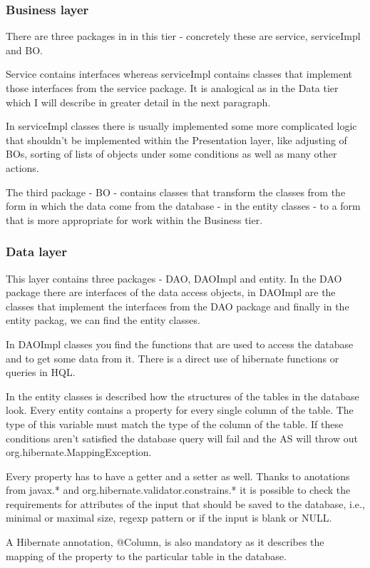\documentclass[thesis=B,english]{FITthesis}[2012/10/20]
\begin{document}
\subsubsection{Business layer}
There are three packages in in this tier - concretely these are service, serviceImpl and BO. 

Service contains interfaces whereas serviceImpl contains classes that implement those interfaces from the service package. It is analogical as in the Data tier which I will describe in greater detail in the next paragraph.

In serviceImpl classes there is usually implemented some more complicated logic that shouldn't be implemented within the Presentation layer, like adjusting of BOs, sorting of lists of objects under some conditions as well as many other actions.

The third package - BO - contains classes that transform the classes from the form in which the data come from the database - in the entity classes - to a form that is more appropriate for work within the Business tier.
\subsubsection{Data layer}
This layer contains three packages - DAO, DAOImpl and entity. In the DAO package there are interfaces of the data access objects, in DAOImpl are the classes that implement the interfaces from the DAO package and finally in the entity packag, we can find the entity classes.

In DAOImpl classes you find the functions that are used to access the database and to get some data from it. There is a direct use of hibernate functions or queries in HQL.

In the entity classes is described how the structures of the tables in the database look. Every entity contains a property for every single column of the table. The type of this variable must match the type of the column of the table. If these conditions aren't satisfied the database query will fail and the AS will throw out org.hibernate.MappingException.

Every property has to have a getter and a setter as well. Thanks to anotations from javax.* and org.hibernate.validator.constrains.* it is possible to check the requirements for attributes of the input that should be saved to the database, i.e., minimal or maximal size, regexp pattern or if the input is blank or NULL.

A Hibernate annotation, @Column, is also mandatory as it describes the mapping of the property to the particular table in the database.
\end{document}
